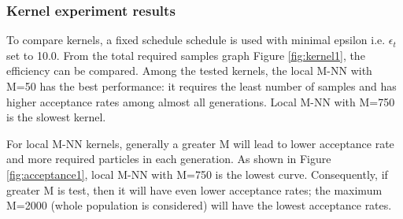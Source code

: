 \documentclass[12pt,a4paper]{report}
\begin{document}
\subsubsection{Kernel experiment results}

To compare kernels, a fixed schedule schedule is used with minimal epsilon i.e. $\epsilon_t$ set to 10.0. From the total required samples graph Figure \ref{fig:kernel1}, the efficiency can be compared. Among the tested kernels, the local M-NN with M=50 has the best performance: it requires the least number of samples and
has higher acceptance rates among almost all generations. Local M-NN with M=750 is the slowest kernel.

For local M-NN kernels, generally a greater M will lead to lower acceptance rate and
more required particles in each generation. As shown in Figure \ref{fig:acceptance1}, local M-NN with M=750 is the lowest curve. Consequently, if greater M is test, then it will have even lower acceptance rates; the maximum M=2000 (whole population is considered) will have the lowest acceptance rates.
\end{document}
